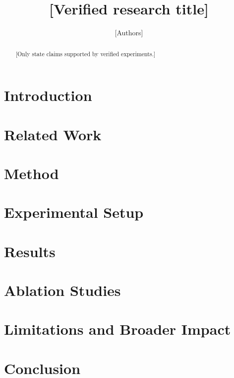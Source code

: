\documentclass{article}
\title{[Verified research title]}
\author{[Authors]}
\begin{document}
\maketitle
\begin{abstract}
[Only state claims supported by verified experiments.]
\end{abstract}
\section{Introduction}
\section{Related Work}
\section{Method}
\section{Experimental Setup}
\section{Results}
\section{Ablation Studies}
\section{Limitations and Broader Impact}
\section{Conclusion}


\end{document}
